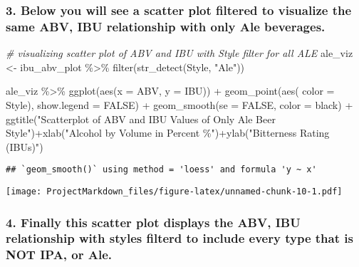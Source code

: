 \documentclass[
]{article}
\newenvironment{Shaded}{\begin{snugshade}}{\end{snugshade}}
\newcommand{\AttributeTok}[1]{\textcolor[rgb]{0.77,0.63,0.00}{#1}}
\newcommand{\CommentTok}[1]{\textcolor[rgb]{0.56,0.35,0.01}{\textit{#1}}}
\newcommand{\ConstantTok}[1]{\textcolor[rgb]{0.00,0.00,0.00}{#1}}
\newcommand{\FunctionTok}[1]{\textcolor[rgb]{0.00,0.00,0.00}{#1}}
\newcommand{\NormalTok}[1]{#1}
\newcommand{\OtherTok}[1]{\textcolor[rgb]{0.56,0.35,0.01}{#1}}
\newcommand{\SpecialCharTok}[1]{\textcolor[rgb]{0.00,0.00,0.00}{#1}}
\newcommand{\StringTok}[1]{\textcolor[rgb]{0.31,0.60,0.02}{#1}}
\begin{document}
\hypertarget{below-you-will-see-a-scatter-plot-filtered-to-visualize-the-same-abv-ibu-relationship-with-only-ale-beverages.}{%
\subsubsection{3. Below you will see a scatter plot filtered to
visualize the same ABV, IBU relationship with only Ale
beverages.}\label{below-you-will-see-a-scatter-plot-filtered-to-visualize-the-same-abv-ibu-relationship-with-only-ale-beverages.}}

\begin{Shaded}
\begin{Highlighting}[]
\CommentTok{\# visualizing scatter plot of ABV and IBU with Style filter for all ALE}
\NormalTok{ale\_viz }\OtherTok{\textless{}{-}}\NormalTok{ ibu\_abv\_plot }\SpecialCharTok{\%\textgreater{}\%} \FunctionTok{filter}\NormalTok{(}\FunctionTok{str\_detect}\NormalTok{(Style, }\StringTok{"Ale"}\NormalTok{))}

\NormalTok{ale\_viz }\SpecialCharTok{\%\textgreater{}\%} \FunctionTok{ggplot}\NormalTok{(}\FunctionTok{aes}\NormalTok{(}\AttributeTok{x =}\NormalTok{ ABV, }\AttributeTok{y =}\NormalTok{ IBU)) }\SpecialCharTok{+}
  \FunctionTok{geom\_point}\NormalTok{(}\FunctionTok{aes}\NormalTok{( }\AttributeTok{color =}\NormalTok{ Style), }\AttributeTok{show.legend =} \ConstantTok{FALSE}\NormalTok{) }\SpecialCharTok{+}
  \FunctionTok{geom\_smooth}\NormalTok{(}\AttributeTok{se =} \ConstantTok{FALSE}\NormalTok{, }\AttributeTok{color =} \StringTok{\textquotesingle{}black\textquotesingle{}}\NormalTok{) }\SpecialCharTok{+}
  \FunctionTok{ggtitle}\NormalTok{(}\StringTok{"Scatterplot of ABV and IBU Values of Only Ale Beer Style"}\NormalTok{)}\SpecialCharTok{+}\FunctionTok{xlab}\NormalTok{(}\StringTok{"Alcohol by Volume in Percent \%"}\NormalTok{)}\SpecialCharTok{+}\FunctionTok{ylab}\NormalTok{(}\StringTok{"Bitterness Rating (IBUs)"}\NormalTok{)}
\end{Highlighting}
\end{Shaded}

\begin{verbatim}
## `geom_smooth()` using method = 'loess' and formula 'y ~ x'
\end{verbatim}

\texttt{[image: ProjectMarkdown\_files/figure-latex/unnamed-chunk-10-1.pdf]}

\hypertarget{finally-this-scatter-plot-displays-the-abv-ibu-relationship-with-styles-filterd-to-include-every-type-that-is-not-ipa-or-ale.}{%
\subsubsection{4. Finally this scatter plot displays the ABV, IBU
relationship with styles filterd to include every type that is NOT IPA,
or
Ale.}\label{finally-this-scatter-plot-displays-the-abv-ibu-relationship-with-styles-filterd-to-include-every-type-that-is-not-ipa-or-ale.}}
\end{document}
